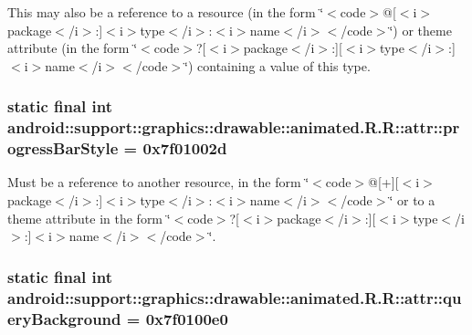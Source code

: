 This may also be a reference to a resource (in the form \char`\"{}$<$code$>$@\mbox{[}$<$i$>$package$<$/i$>$:\mbox{]}$<$i$>$type$<$/i$>$:$<$i$>$name$<$/i$>$$<$/code$>$\char`\"{}) or theme attribute (in the form \char`\"{}$<$code$>$?\mbox{[}$<$i$>$package$<$/i$>$:\mbox{]}\mbox{[}$<$i$>$type$<$/i$>$:\mbox{]}$<$i$>$name$<$/i$>$$<$/code$>$\char`\"{}) containing a value of this type. \hypertarget{classandroid_1_1support_1_1graphics_1_1drawable_1_1animated_1_1_r_1_1attr_2dda55e1072c090180314f4d607b5f5c}{
\subsubsection[{progressBarStyle}]{\setlength{\rightskip}{0pt plus 5cm}static final int android::support::graphics::drawable::animated.R.R::attr::progressBarStyle = 0x7f01002d}}
\label{classandroid_1_1support_1_1graphics_1_1drawable_1_1animated_1_1_r_1_1attr_2dda55e1072c090180314f4d607b5f5c}


Must be a reference to another resource, in the form \char`\"{}$<$code$>$@\mbox{[}+\mbox{]}\mbox{[}$<$i$>$package$<$/i$>$:\mbox{]}$<$i$>$type$<$/i$>$:$<$i$>$name$<$/i$>$$<$/code$>$\char`\"{} or to a theme attribute in the form \char`\"{}$<$code$>$?\mbox{[}$<$i$>$package$<$/i$>$:\mbox{]}\mbox{[}$<$i$>$type$<$/i$>$:\mbox{]}$<$i$>$name$<$/i$>$$<$/code$>$\char`\"{}. \hypertarget{classandroid_1_1support_1_1graphics_1_1drawable_1_1animated_1_1_r_1_1attr_750d5752f98c5b32167100acfa9834de}{
\subsubsection[{queryBackground}]{\setlength{\rightskip}{0pt plus 5cm}static final int android::support::graphics::drawable::animated.R.R::attr::queryBackground = 0x7f0100e0}}
\label{classandroid_1_1support_1_1graphics_1_1drawable_1_1animated_1_1_r_1_1attr_750d5752f98c5b32167100acfa9834de}


